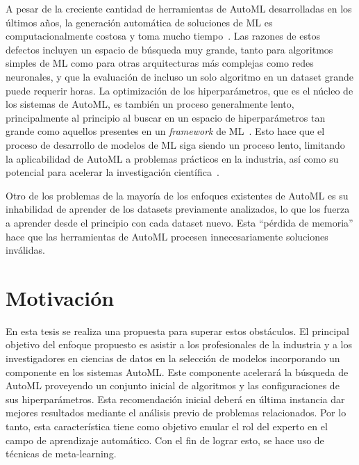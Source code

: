 A pesar de la creciente cantidad de herramientas de AutoML desarrolladas en los últimos años, la generación automática de soluciones de ML es computacionalmente costosa y toma mucho tiempo~\cite{crisan2021fits}. Las razones de estos defectos incluyen un espacio de búsqueda muy grande, tanto para algoritmos simples de ML como para otras arquitecturas más complejas como redes neuronales, y que la evaluación de incluso un solo algoritmo en un dataset grande puede requerir horas. La optimización de los hiperparámetros, que es el núcleo de los sistemas de AutoML, es también un proceso generalmente lento, principalmente al principio al buscar en un espacio de hiperparámetros tan grande como aquellos presentes en un \textit{framework} de ML~\cite{fuerer2015efficient}. Esto hace que el proceso de desarrollo de modelos de ML siga siendo un proceso lento, limitando la aplicabilidad de AutoML a problemas prácticos en la industria, así como su potencial para acelerar la investigación científica~\cite{crisan2021fits}.

Otro de los problemas de la mayoría de los enfoques existentes de AutoML es su inhabilidad de aprender de los datasets previamente analizados, lo que los fuerza a aprender desde el principio con cada dataset nuevo. Esta ``pérdida de memoria'' hace que las herramientas de AutoML procesen innecesariamente soluciones inválidas. %



\section*{Motivación}

En esta tesis se realiza una propuesta para superar estos obstáculos. El principal objetivo del enfoque propuesto es asistir a los profesionales de la industria y a los investigadores en ciencias de datos en la selección de modelos incorporando un componente en los sistemas AutoML. Este componente acelerará la búsqueda de AutoML proveyendo un conjunto inicial de algoritmos y las configuraciones de sus hiperparámetros. Esta recomendación inicial deberá en última instancia dar mejores resultados mediante el análisis previo de problemas relacionados. Por lo tanto, esta característica tiene como objetivo emular el rol del experto en el campo de aprendizaje automático. Con el fin de lograr esto, se hace uso de técnicas de meta-learning. 

